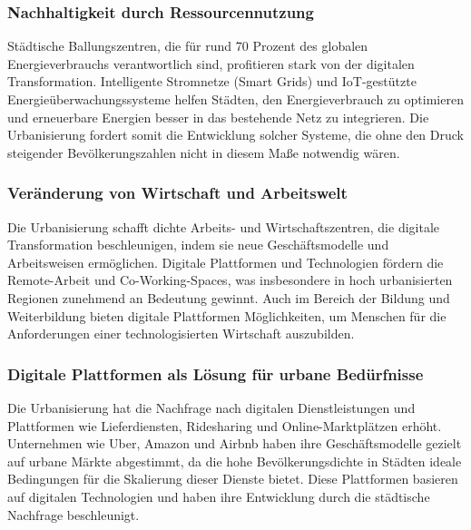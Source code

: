 \documentclass[conference,compsoc,final,a4paper, onecolumn, 11pt]{IEEEtran}
\begin{document}
\subsubsection{Nachhaltigkeit durch Ressourcennutzung}
Städtische Ballungszentren, die für rund 70 Prozent des globalen Energieverbrauchs verantwortlich sind, profitieren stark von der digitalen Transformation. 
Intelligente Stromnetze (Smart Grids) und \ac{IoT}-gestützte Energieüberwachungssysteme helfen Städten, den Energieverbrauch zu optimieren und erneuerbare Energien besser in das bestehende Netz zu integrieren.
Die Urbanisierung fordert somit die Entwicklung solcher Systeme, die ohne den Druck steigender Bevölkerungszahlen nicht in diesem Maße notwendig wären. \autocite{sensors_smart_2015}
 

\subsubsection{Veränderung von Wirtschaft und Arbeitswelt}
Die Urbanisierung schafft dichte Arbeits- und Wirtschaftszentren, die digitale Transformation beschleunigen, indem sie neue Geschäftsmodelle und Arbeitsweisen ermöglichen.
Digitale Plattformen und Technologien fördern die Remote-Arbeit und Co-Working-Spaces, was insbesondere in hoch urbanisierten Regionen zunehmend an Bedeutung gewinnt.
Auch im Bereich der Bildung und Weiterbildung bieten digitale Plattformen Möglichkeiten, um Menschen für die Anforderungen einer technologisierten Wirtschaft auszubilden. \autocite{digital_how_2024}


\subsubsection{Digitale Plattformen als Lösung für urbane Bedürfnisse}
Die Urbanisierung hat die Nachfrage nach digitalen Dienstleistungen und Plattformen wie Lieferdiensten, Ridesharing und Online-Marktplätzen erhöht. 
Unternehmen wie Uber, Amazon und Airbnb haben ihre Geschäftsmodelle gezielt auf urbane Märkte abgestimmt, da die hohe Bevölkerungsdichte in Städten ideale Bedingungen für die Skalierung dieser Dienste bietet. 
Diese Plattformen basieren auf digitalen Technologien und haben ihre Entwicklung durch die städtische Nachfrage beschleunigt.\autocite{sustainability_digital_2023}
\end{document}
